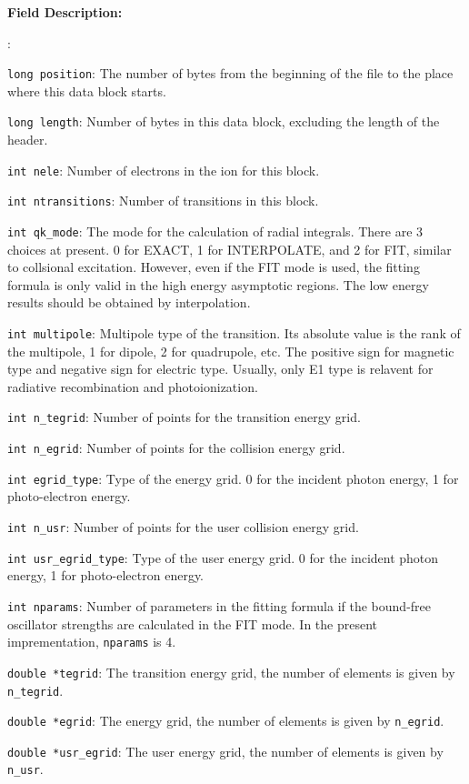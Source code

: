 \documentclass[twoside,letterpaper]{refrep}
\newenvironment{dbdesc}{\textbf{Field Description:} \begin{list}
	{:}{\setlength{\labelwidth}{2in}
	   \setlength{\leftmargin}{2in}
	   \setlength{\labelsep}{0.1in}
	   \setlength{\rightmargin}{0.2in}}}
	{\end{list}}
\begin{document}
\begin{dbdesc}
\item[\texttt{long position}:] The number of bytes from the beginning of the
file to the place where this data block starts.
\item[\texttt{long length}:] Number of bytes in this data block, excluding the
length of the header.
\item[\texttt{int nele}:] Number of electrons in the ion for this block.
\item[\texttt{int ntransitions}:] Number of transitions in this block.
\item[\texttt{int qk\_mode}:] The mode for the calculation of radial
integrals. There are 3 choices at present. 0 for EXACT, 1 for INTERPOLATE, and
2 for FIT, similar to collsional excitation. However, even if the FIT
mode is used, the fitting formula is only valid in the high energy asymptotic
regions. The low energy results should be obtained by interpolation.
\item[\texttt{int multipole}:] Multipole type of the transition. Its absolute
value is the rank of the multipole, 1 for dipole, 2 for quadrupole, etc. The
positive sign for magnetic type and negative sign for electric type. Usually,
only E1 type is relavent for radiative recombination and photoionization.
\item[\texttt{int n\_tegrid}:] Number of points for the transition energy grid.
\item[\texttt{int n\_egrid}:] Number of points for the collision energy grid.
\item[\texttt{int egrid\_type}:] Type of the energy grid. 0 for the incident
photon energy, 1 for photo-electron energy.
\item[\texttt{int n\_usr}:] Number of points for the user collision energy
grid.
\item[\texttt{int usr\_egrid\_type}:] Type of the user energy grid. 0 for the
incident photon energy, 1 for photo-electron energy.
\item[\texttt{int nparams}:] Number of parameters in the fitting formula if the
bound-free oscillator strengths are calculated in the FIT mode. In the present
imprementation, \texttt{nparams} is 4.
\item[\texttt{double *tegrid}:] The transition energy grid, the number of
elements is given by \texttt{n\_tegrid}.
\item[\texttt{double *egrid}:] The energy grid, the number of elements is
given by \texttt{n\_egrid}.
\item[\texttt{double *usr\_egrid}:] The user energy grid, the number of
elements is given by \texttt{n\_usr}.
\end{dbdesc}
\end{document}
